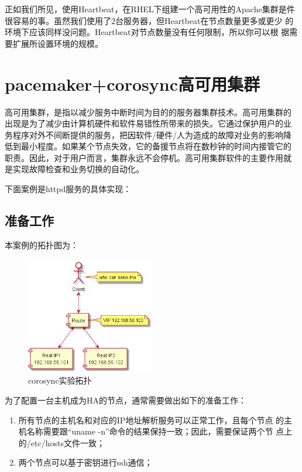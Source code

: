 正如我们所见，使用Heartbeat，在RHEL下组建一个高可用性的Apache集群是件
很容易的事。虽然我们使用了2台服务器，但Heartbeat在节点数量更多或更少
的环境下应该同样没问题。Heartbeat对节点数量没有任何限制，所以你可以根
据需要扩展所设置环境的规模。

\chapter{pacemaker+corosync高可用集群}

高可用集群，是指以减少服务中断时间为目的的服务器集群技术。高可用集群的
出现是为了减少由计算机硬件和软件易错性所带来的损失。它通过保护用户的业
务程序对外不间断提供的服务，把因软件/硬件/人为造成的故障对业务的影响降
低到最小程度。如果某个节点失效，它的备援节点将在数秒钟的时间内接管它的
职责。因此，对于用户而言，集群永远不会停机。高可用集群软件的主要作用就
是实现故障检查和业务切换的自动化。

下面案例是httpd服务的具体实现：

\section{准备工作}

本案例的拓扑图为：

\begin{figure}[!h]
  \centering
  \includegraphics[width=0.5\textwidth]{graph/web_topo.png}
  \caption{corosync实验拓扑}
\end{figure}

为了配置一台主机成为HA的节点，通常需要做出如下的准备工作：
\begin{enumerate}[itemsep=0pt,parsep=0pt]
  \item 所有节点的主机名和对应的IP地址解析服务可以正常工作，且每个节点
    的主机名称需要跟“uname -n”命令的结果保持一致；因此，需要保证两个节
    点上的/etc/hosts文件一致；
  \item 两个节点可以基于密钥进行ssh通信；
\end{enumerate}

